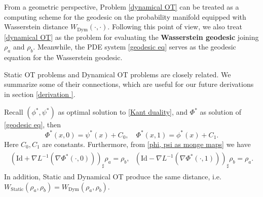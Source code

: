 \documentclass{article}
\begin{document}
From a geometric perspective, Problem \eqref{dynamical OT} can be treated as a computing scheme  for the geodesic on the probability manifold equipped with Wasserstein distance $W_{\textrm{Dym}}(\cdot,\cdot)$. Following this point of view, we also treat \eqref{dynamical OT} as the problem for evaluating the \textbf{Wasserstein geodesic} joining $\rho_a$ and $\rho_b$. Meanwhile, the PDE system \eqref{geodesic eq} serves as the geodesic equation for the Wasserstein geodesic. %


Static OT problems and Dynamical OT problems are closely related. We summarize some of their connections, which are useful for our future derivations in section \ref{derivation }. 

Recall $(\phi^*,\psi^*)$ as optimal solution to \eqref{Kant duality}, and $\Phi^*$ as solution of \eqref{geodesic eq}, then
\begin{equation}
 \Phi^*(x, 0) = \psi^*(x) + C_0,\quad \Phi^*(x,1) = \phi^*(x) + C_1.   \label{static dual = dynamic dual}
\end{equation}
Here $C_0, C_1$ are constants. Furthermore, from \eqref{phi, psi as monge maps} we have
\begin{align}
\label{Phi0, Phi1 as monge maps}
 \begin{split}
  (\textrm{Id}+\nabla L^{-1}(\nabla\Phi^*(\cdot, 0)))_{\sharp}\rho_a=\rho_b,~~~  %
  (\textrm{Id}-\nabla L^{-1}(\nabla\Phi^*(\cdot, 1)))_{\sharp}\rho_b = \rho_a. 
 \end{split}
\end{align}
In addition, Static and Dynamical OT produce the same distance, i.e. $W_{\textrm{Static}}(\rho_a, \rho_b) = W_{\textrm{Dym}}(\rho_a, \rho_b)$. %
\end{document}
